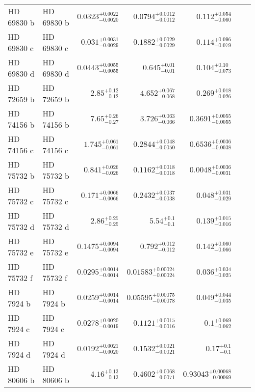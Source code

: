 \begin{longtable*}{llrrrrr}
HD 69830 b & HD 69830 b & $0.0323^{+0.0022}_{-0.0020}$ & $0.0794^{+0.0012}_{-0.0012}$ & $0.112^{+0.054}_{-0.060}$ & \cite{Lovis06} & \\ 
HD 69830 c & HD 69830 c & $0.031^{+0.0031}_{-0.0029}$ & $0.1882^{+0.0029}_{-0.0029}$ & $0.114^{+0.096}_{-0.079}$ & \cite{Lovis06} & \\ 
HD 69830 d & HD 69830 d & $0.0443^{+0.0055}_{-0.0055}$ & $0.645^{+0.01}_{-0.01}$ & $0.104^{+0.10}_{-0.073}$ & \cite{Lovis06} & \\ 
HD 72659 b & HD 72659 b & $2.85^{+0.12}_{-0.12}$ & $4.652^{+0.067}_{-0.068}$ & $0.269^{+0.018}_{-0.026}$ & \cite{Butler03} & \\ 
HD 74156 b & HD 74156 b & $7.65^{+0.26}_{-0.27}$ & $3.726^{+0.063}_{-0.066}$ & $0.3691^{+0.0055}_{-0.0055}$ & \cite{Naef04} & \\ 
HD 74156 c & HD 74156 c & $1.745^{+0.061}_{-0.061}$ & $0.2844^{+0.0048}_{-0.0050}$ & $0.6536^{+0.0036}_{-0.0038}$ & \cite{Naef04} & \\ 
HD 75732 b & HD 75732 b & $0.841^{+0.026}_{-0.026}$ & $0.1162^{+0.0018}_{-0.0018}$ & $0.0048^{+0.0036}_{-0.0031}$ & \cite{Butler97} & \\ 
HD 75732 c & HD 75732 c & $0.171^{+0.0066}_{-0.0066}$ & $0.2432^{+0.0037}_{-0.0038}$ & $0.048^{+0.031}_{-0.029}$ & \cite{McArthur04} & \\ 
HD 75732 d & HD 75732 d & $2.86^{+0.25}_{-0.25}$ & $5.54^{+0.1}_{-0.1}$ & $0.139^{+0.015}_{-0.016}$ & \cite{Marcy02} & \\ 
HD 75732 e & HD 75732 e & $0.1475^{+0.0094}_{-0.0094}$ & $0.792^{+0.012}_{-0.012}$ & $0.142^{+0.060}_{-0.066}$ & \cite{McArthur04} & \\ 
HD 75732 f & HD 75732 f & $0.0295^{+0.0014}_{-0.0014}$ & $0.01583^{+0.00024}_{-0.00024}$ & $0.036^{+0.034}_{-0.025}$ & \cite{Fischer08} & \\ 
HD 7924 b & HD 7924 b & $0.0259^{+0.0014}_{-0.0014}$ & $0.05595^{+0.00075}_{-0.00078}$ & $0.049^{+0.044}_{-0.035}$ & \cite{Fulton15} & \\ 
HD 7924 c & HD 7924 c & $0.0278^{+0.0020}_{-0.0019}$ & $0.1121^{+0.0015}_{-0.0016}$ & $0.1^{+0.069}_{-0.062}$ & \cite{Fulton15} & \\ 
HD 7924 d & HD 7924 d & $0.0192^{+0.0021}_{-0.0020}$ & $0.1532^{+0.0021}_{-0.0021}$ & $0.17^{+0.1}_{-0.1}$ & \cite{Fulton15} & \\ 
HD 80606 b & HD 80606 b & $4.16^{+0.13}_{-0.13}$ & $0.4602^{+0.0068}_{-0.0071}$ & $0.93043^{+0.00068}_{-0.00069}$ & \cite{Wittenmyer07} & \\ 

\end{longtable*}
